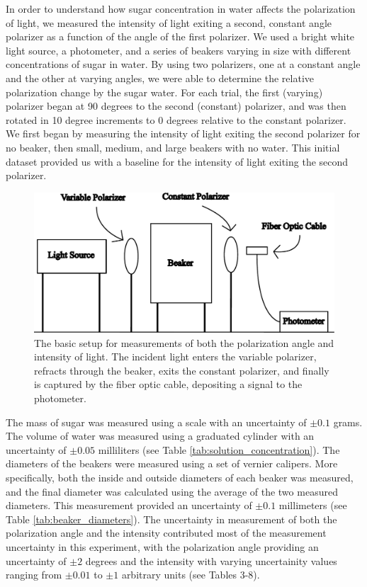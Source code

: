 
In order to understand how sugar concentration in water affects the polarization of light, we measured the intensity of light exiting a second, constant angle polarizer as a function of the angle of the first polarizer. We used a bright white light source, a photometer, and a series of beakers varying in size with different concentrations of sugar in water. By using two polarizers, one at a constant angle and the other at varying angles, we were able to determine the relative polarization change by the sugar water. For each trial, the first (varying) polarizer began at 90 degrees to the second (constant) polarizer, and was then rotated in 10 degree increments to 0 degrees relative to the constant polarizer. We first began by measuring the intensity of light exiting the second polarizer for no beaker, then small, medium, and large beakers with no water. This initial dataset provided us with a baseline for the intensity of light exiting the second polarizer.

\begin{figure}[H]
\centering
\includegraphics[scale=0.4]{../figures/setup.pdf}
\caption{The basic setup for measurements of both the polarization angle and intensity of light. The incident light enters the variable polarizer, refracts through the beaker, exits the constant polarizer, and finally is captured by the fiber optic cable, depositing a signal to the photometer.}
\end{figure}

The mass of sugar was measured using a scale with an uncertainty of $\pm 0.1$ grams. The volume of water was measured using a graduated cylinder with an uncertainty of $\pm 0.05$ milliliters (see Table \ref{tab:solution_concentration}). The diameters of the beakers were measured using a set of vernier calipers. More specifically, both the inside and outside diameters of each beaker was measured, and the final diameter was calculated using the average of the two measured diameters. This measurement provided an uncertainty of $\pm 0.1$ millimeters (see Table \ref{tab:beaker_diameters}). The uncertainty in measurement of both the polarization angle and the intensity contributed most of the measurement uncertainty in this experiment, with the polarization angle providing an uncertainty of $\pm 2$ degrees and the intensity with varying uncertainity values ranging from $\pm 0.01$ to $\pm 1$ arbitrary units (see Tables 3-8).

